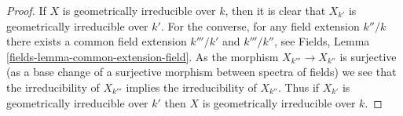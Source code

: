 \documentclass[10pt,a4paper]{amsart}
\theoremstyle{plain}
\theoremstyle{definition}
\theoremstyle{remark}
\numberwithin{equation}{subsection}
\begin{document}
\begin{proof}
If $X$ is geometrically irreducible over $k$, then it is clear that
$X_{k'}$ is geometrically irreducible over $k'$. For the converse,
for any field extension $k''/k$ there exists a common
field extension $k'''/k'$ and $k'''/k''$, see Fields, Lemma
\ref{fields-lemma-common-extension-field}. As the
morphism $X_{k'''} \to X_{k''}$ is surjective (as a base change of
a surjective morphism between spectra of fields) we see that the
irreducibility of $X_{k'''}$ implies the irreducibility of $X_{k''}$.
Thus if $X_{k'}$ is geometrically irreducible over $k'$ then
$X$ is geometrically irreducible over $k$.
\end{proof}
\end{document}
